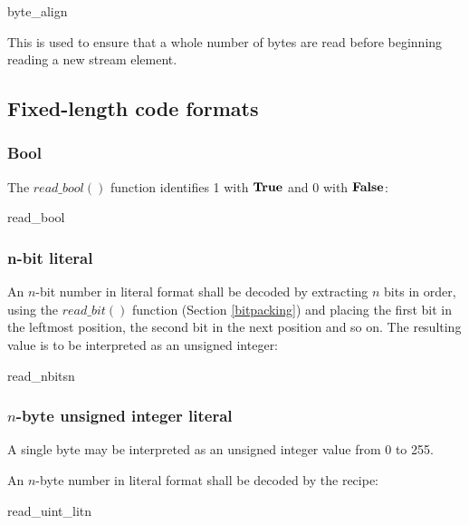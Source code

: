 \begin{pseudo}{byte\_align}{}
\bsEND
\end{pseudo}

This is used to ensure that a whole number of bytes are read before
beginning reading a new stream element.

\subsection{Fixed-length code formats}
\subsubsection{Bool}

The $read\_bool()$ function identifies 1 with $\text{\bf{True}}$ and 0 with $\text{\bf{False}}$:

\begin{pseudo}{read\_bool}{}
    \bsRET{\true}
\bsELSE
    \bsRET{\false}
\bsEND
\end{pseudo}

\subsubsection{n-bit literal}
An $n$-bit number in literal format shall be decoded by extracting $n$ bits
in order, using the $read\_bit()$ function (Section \ref{bitpacking})
 and placing the first bit in the leftmost position, the second
bit in the next position and so on. The resulting value is to be
interpreted as an unsigned integer:

\begin{pseudo}{read\_nbits}{n}
\bsEND
{}
\end{pseudo}

\subsubsection{$n$-byte unsigned integer literal}
A single byte may be interpreted as an unsigned integer value from 0 to 255.

An $n$-byte number in literal format shall be decoded by the recipe:

\begin{pseudo}{read\_uint\_lit}{n}
\bsEND
{}
\end{pseudo}

